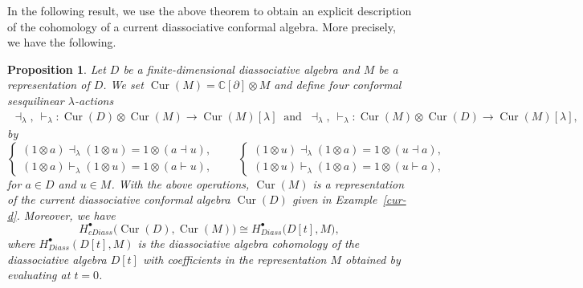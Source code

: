 \documentclass[a4paper,reqno,10pt]{amsart}
\theoremstyle{plain}
\newtheorem{proposition}[thm]{Proposition}
\theoremstyle{definition}
\theoremstyle{remark}
\newcommand{\la}{\lambda}
\begin{document}
In the following result, we use the above theorem to obtain an explicit description of the cohomology of a current diassociative conformal algebra. More precisely, we have the following.
 
\begin{proposition}\label{prop-cur}
Let $D$ be a finite-dimensional diassociative algebra and $M$ be a
representation of $D$. We set $\operatorname{Cur}(M)=\mathbb{C}[\partial]\otimes M$ and define four conformal sesquilinear $\la$-actions
\begin{align*}
\dashv_\la,\ \vdash_\la:
\operatorname{Cur}(D)\otimes \operatorname{Cur}(M)
\longrightarrow \operatorname{Cur}(M)[\la] ~\text{ and } ~\dashv_\la,\ \vdash_\la:
\operatorname{Cur}(M)\otimes \operatorname{Cur}(D)
\longrightarrow \operatorname{Cur}(M)[\la],
\end{align*}
by
\[
\begin{cases}
(1\otimes a)\dashv_\la(1\otimes u)
 =1\otimes(a\dashv u),\\
(1\otimes a)\vdash_\la(1\otimes u)
 =1\otimes(a\vdash u),
\end{cases}
\qquad
\begin{cases}
(1\otimes u)\dashv_\la(1\otimes a)
 =1\otimes(u\dashv a),\\
(1\otimes u)\vdash_\la(1\otimes a)
 =1\otimes(u\vdash a),
\end{cases}
\]
for $a\in D$ and $u\in M$. With the above operations, $\operatorname{Cur}(M)$ is a representation
of the current diassociative conformal algebra $\operatorname{Cur}(D)$
given in Example~\ref{cur-d}. Moreover, we have
\[
H^\bullet_{{cDiass}}
\bigl(\operatorname{Cur}(D),\operatorname{Cur}(M)\bigr)
\cong
H^\bullet_{{Diass}}\bigl(D[t],M\bigr),
\]
where $H^\bullet_{{Diass}}(D[t],M)$ is the diassociative
algebra cohomology of the diassociative algebra $D[t]$ with coefficients in the representation $M$ obtained by evaluating at $t=0$.
\end{proposition}
\end{document}
